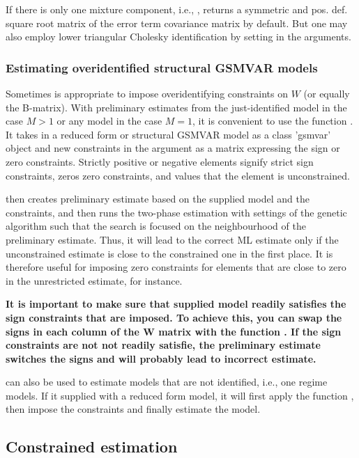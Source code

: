 \documentclass[nojss]{jss}
\begin{document}
If there is only one mixture component, i.e., ,  returns a symmetric and pos. def. square root matrix of the error term covariance matrix by default. But one may also employ lower triangular Cholesky identification by setting  in the arguments.

\subsubsection{Estimating overidentified structural GSMVAR models}
Sometimes is appropriate to impose overidentifying constraints on $W$ (or equally the B-matrix). With preliminary estimates from the just-identified model in the case $M>1$ or any model in the case $M=1$, it is convenient to use the function . It takes in a reduced form or structural GSMVAR model as a class 'gsmvar' object and new constraints in the argument  as a matrix expressing the sign or zero constraints. Strictly positive or negative elements signify strict sign constraints, zeros zero constraints, and  values that the element is unconstrained.

 then creates preliminary estimate based on the supplied model and the constraints, and then runs the two-phase estimation with settings of the genetic algorithm such that the search is focused on the neighbourhood of the preliminary estimate. Thus, it will lead to the correct ML estimate only if the unconstrained estimate is close to the constrained one in the first place. It is therefore useful for imposing zero constraints for elements that are close to zero in the unrestricted estimate, for instance.

\textbf{It is important to make sure that supplied model readily satisfies the sign constraints that are imposed. To achieve this, you can swap the signs in each column of the W matrix with the function . If the sign constraints are not not readily satisfie, the preliminary estimate switches the signs and will probably lead to incorrect estimate.}

 can also be used to estimate models that are not identified, i.e., one regime models. If it supplied with a reduced form model, it will first apply the function , then impose the constraints and finally estimate the model.

\subsection{Constrained estimation}\label{sec:examp_const}
\end{document}
